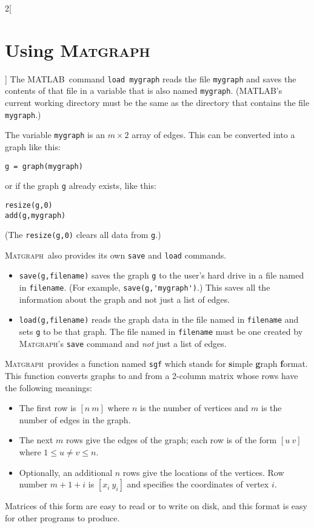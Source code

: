\documentclass{amsart}
\newcommand\matlab{MATLAB}
\newcommand\matgraph{\textsc{Matgraph}}
\begin{document}
\begin{multicols}{2}[\section{Using \matgraph}]
The \matlab\ command \verb|load mygraph| reads the file \verb|mygraph|
and saves the contents of that file in a variable that is also named
\verb|mygraph|. (\matlab's current working directory must be the same
as the directory that contains the file \verb|mygraph|.)

The variable \verb|mygraph| is an $m\times 2$ array of edges. This can
be converted into a graph like this:
\begin{verbatim}
g = graph(mygraph)
\end{verbatim}
or if the graph \verb|g| already exists, like this:
\begin{verbatim}
resize(g,0)
add(g,mygraph)
\end{verbatim}
(The \verb|resize(g,0)| clears all data from \verb|g|.)

\matgraph\ also provides its own \verb|save| and \verb|load| commands.
\begin{itemize}
\item \verb|save(g,filename)| saves the graph \verb|g| to the user's
  hard drive in a file named in \verb|filename|. (For example,
  \verb|save(g,'mygraph')|.)  This saves all the information about the
  graph and not just a list of edges.
  
\item \verb|load(g,filename)| reads the graph data in the file named
  in \verb|filename| and sets \verb|g| to be that graph. The file
  named in \verb|filename| must be one created by \matgraph's
  \verb|save| command and \emph{not} just a list of edges. 
\end{itemize}


\matgraph\ provides a function named \verb|sgf| which stands for
\textbf simple \textbf graph \textbf format. This function converts
graphs to and from a 2-column matrix whose rows have the following
meanings:
\begin{itemize}
\item The first row is $[n~m]$ where $n$ is the number of vertices and
  $m$ is the number of edges in the graph.

\item The next $m$ rows give the edges of the graph; each row is of
  the form $[u~v]$ where $1 \le u\not=v \le n$.

\item Optionally, an additional $n$ rows give the locations of the
  vertices. Row number $m+1+i$ is $[x_i~y_i]$ and specifies the
  coordinates of vertex $i$. 
\end{itemize}
Matrices of this form are easy to read or to write on disk, and this
format is easy for other programs to produce. 



\end{multicols}
\end{document}
